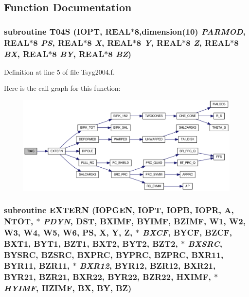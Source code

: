 \subsection{Function Documentation}
\hypertarget{_tsyg2004_8f_76115f6519bc65ea6c916f3272219d4a}{
\subsubsection[{T04S}]{\setlength{\rightskip}{0pt plus 5cm}subroutine T04S (IOPT, \/  REAL$\ast$8,dimension(10) {\em PARMOD}, \/  REAL$\ast$8 {\em PS}, \/  REAL$\ast$8 {\em X}, \/  REAL$\ast$8 {\em Y}, \/  REAL$\ast$8 {\em Z}, \/  REAL$\ast$8 {\em BX}, \/  REAL$\ast$8 {\em BY}, \/  REAL$\ast$8 {\em BZ})}}
\label{_tsyg2004_8f_76115f6519bc65ea6c916f3272219d4a}




Definition at line 5 of file Tsyg2004.f.

Here is the call graph for this function:\nopagebreak
\begin{figure}[H]
\begin{center}
\leavevmode
\includegraphics[width=352pt]{_tsyg2004_8f_76115f6519bc65ea6c916f3272219d4a_cgraph}
\end{center}
\end{figure}
\hypertarget{_tsyg2004_8f_f4e6ad8b8fa3f74e2914723b740c130c}{
\subsubsection[{EXTERN}]{\setlength{\rightskip}{0pt plus 5cm}subroutine EXTERN (IOPGEN, \/  IOPT, \/  IOPB, \/  IOPR, \/  A, \/  NTOT, \/  $\ast$ {\em PDYN}, \/  DST, \/  BXIMF, \/  BYIMF, \/  BZIMF, \/  W1, \/  W2, \/  W3, \/  W4, \/  W5, \/  W6, \/  PS, \/  X, \/  Y, \/  Z, \/  $\ast$ {\em BXCF}, \/  BYCF, \/  BZCF, \/  BXT1, \/  BYT1, \/  BZT1, \/  BXT2, \/  BYT2, \/  BZT2, \/  $\ast$ {\em BXSRC}, \/  BYSRC, \/  BZSRC, \/  BXPRC, \/  BYPRC, \/  BZPRC, \/  BXR11, \/  BYR11, \/  BZR11, \/  $\ast$ {\em BXR12}, \/  BYR12, \/  BZR12, \/  BXR21, \/  BYR21, \/  BZR21, \/  BXR22, \/  BYR22, \/  BZR22, \/  HXIMF, \/  $\ast$ {\em HYIMF}, \/  HZIMF, \/  BX, \/  BY, \/  BZ)}}
\label{_tsyg2004_8f_f4e6ad8b8fa3f74e2914723b740c130c}




